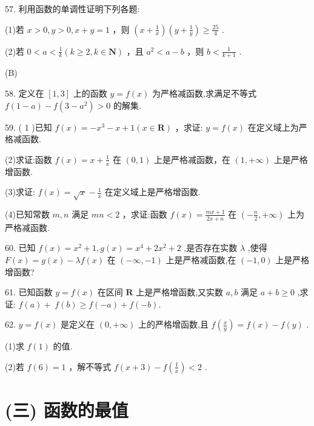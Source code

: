 \documentclass[10pt]{article}
\begin{document}
57. 利用函数的单调性证明下列各题:

(1)若 \(x > 0,y > 0,x + y = 1\) ，则 \(\left( {x + \frac{1}{x}}\right) \left( {y + \frac{1}{y}}\right)  \geq  \frac{25}{4}\) .

(2)若 \(0 < a < \frac{1}{k}\left( {k \geq  2,k \in  \mathbf{N}}\right)\) ，且 \({a}^{2} < a - b\) ，则 \(b < \frac{1}{k + 1}\) .

(B)

58. 定义在 \(\left\lbrack  {1,3}\right\rbrack\) 上的函数 \(y = f\left( x\right)\) 为严格减函数,求满足不等式 \(f\left( {1 - a}\right)  - f\left( {3 - {a}^{2}}\right)  > 0\) 的解集.

59. ( 1 )已知 \(f\left( x\right)  =  - {x}^{3} - x + 1\left( {x \in  \mathbf{R}}\right)\) ，求证: \(y = f\left( x\right)\) 在定义域上为严格减函数.

(2)求证:函数 \(f\left( x\right)  = x + \frac{1}{x}\) 在 \(\left( {0,1}\right)\) 上是严格减函数，在 \(\left( {1, + \infty }\right)\) 上是严格增函数.

(3)求证: \(f\left( x\right)  = \sqrt{x} - \frac{1}{x}\) 在定义域上是严格增函数.

(4)已知常数 \(m,n\) 满足 \({mn} < 2\) ，求证:函数 \(f\left( x\right)  = \frac{{mx} + 1}{{2x} + n}\) 在 \(\left( {-\frac{n}{2}, + \infty }\right)\) 上为严格减函数.

60. 已知 \(f\left( x\right)  = {x}^{2} + 1,g\left( x\right)  = {x}^{4} + 2{x}^{2} + 2\) ,是否存在实数 \(\lambda\) ,使得 \(F\left( x\right)  = g\left( x\right)  - {\lambda f}\left( x\right)\) 在 \(\left( {-\infty , - 1}\right)\) 上是严格减函数,在 \(\left( {-1,0}\right)\) 上是严格增函数?

61. 已知函数 \(y = f\left( x\right)\) 在区间 \(\mathbf{R}\) 上是严格增函数,又实数 \(a,b\) 满足 \(a + b \geq  0\) ,求证: \(f\left( a\right)  + \; f\left( b\right)  \geq  f\left( {-a}\right)  + f\left( {-b}\right) .\)

62. \(y = f\left( x\right)\) 是定义在 \(\left( {0, + \infty }\right)\) 上的严格增函数,且 \(f\left( \frac{x}{y}\right)  = f\left( x\right)  - f\left( y\right)\) .

(1)求 \(f\left( 1\right)\) 的值.

(2)若 \(f\left( 6\right)  = 1\) ，解不等式 \(f\left( {x + 3}\right)  - f\left( \frac{1}{x}\right)  < 2\) .

\section*{(三) 函数的最值}
\end{document}
